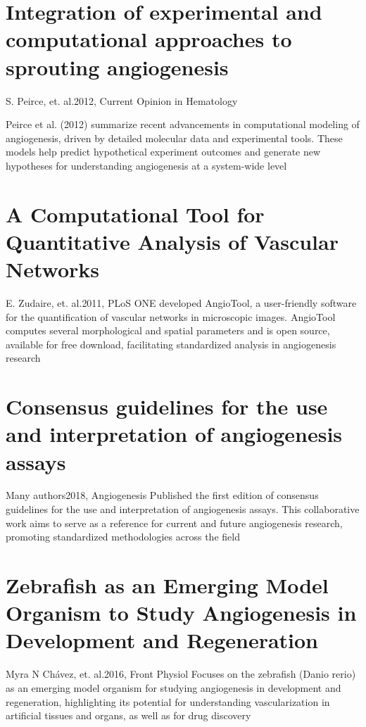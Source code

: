 \section{Integration of experimental and computational approaches to sprouting angiogenesis}{S. Peirce, et. al.}{2012, Current Opinion in Hematology}

Peirce et al. (2012) summarize recent advancements in computational modeling of angiogenesis, driven by detailed molecular data and experimental tools. These models help predict hypothetical experiment outcomes and generate new hypotheses for understanding angiogenesis at a system-wide level \cite{Peirce2012}

\section{A Computational Tool for Quantitative Analysis of Vascular Networks}{E. Zudaire, et. al.}{2011, PLoS ONE}
developed AngioTool, a user-friendly software for the quantification of vascular networks in microscopic images. AngioTool computes several morphological and spatial parameters and is open source, available for free download, facilitating standardized analysis in angiogenesis research \cite{Zudaire2011}

\section{Consensus guidelines for the use and interpretation of angiogenesis assays}{Many authors}{2018, Angiogenesis}
Published the first edition of consensus guidelines for the use and interpretation of angiogenesis assays. This collaborative work aims to serve as a reference for current and future angiogenesis research, promoting standardized methodologies across the field \cite{NowakSliwinska2018a}

\section{Zebrafish as an Emerging Model Organism to Study Angiogenesis in Development and Regeneration}{Myra N Chávez, et. al.}{2016, Front Physiol}
Focuses on the zebrafish (Danio rerio) as an emerging model organism for studying angiogenesis in development and regeneration, highlighting its potential for understanding vascularization in artificial tissues and organs, as well as for drug discovery \cite{Chavez2016}




	
	
	

\let\section\oldsection
